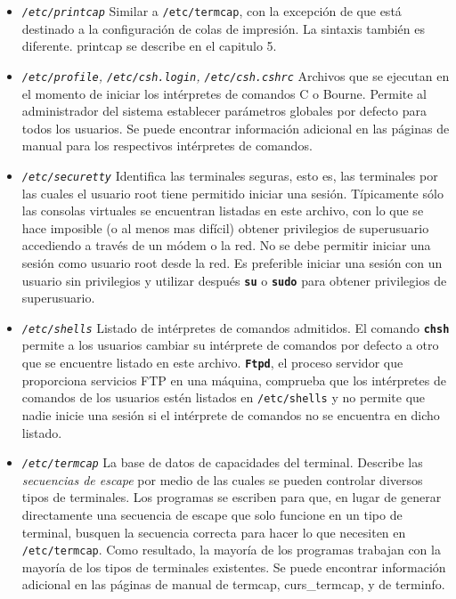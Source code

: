 \begin{itemize}
	
	\item \textit{\texttt{/etc/printcap}}
	 Similar a \texttt{/etc/termcap}, con la
	excepción de que está destinado a la configuración de colas de
	impresión. La sintaxis también es diferente.  printcap se describe en el
	capitulo 5.   
	

	
	\item \textit{\texttt{/etc/profile},
	\texttt{/etc/csh.login},
	\texttt{/etc/csh.cshrc}}  Archivos
	que se ejecutan en el momento de iniciar los intérpretes de comandos C o
	Bourne. Permite al administrador del sistema establecer parámetros
	globales por defecto para todos los usuarios. Se puede encontrar
	información adicional 	en las páginas de manual para los respectivos
	intérpretes de comandos.  



	\item \textit{\texttt{/etc/securetty}}
	 Identifica las terminales seguras, esto es, las
	terminales por las cuales el usuario root tiene permitido iniciar una
	sesión. Típicamente sólo las consolas virtuales se encuentran listadas
	en este archivo, con lo que se hace imposible (o al menos mas difícil)
	obtener privilegios de superusuario accediendo a través de un módem o la
	red. No se debe permitir iniciar una sesión como usuario root desde la
	red. Es preferible iniciar una sesión con un usuario sin privilegios y
	utilizar después \texttt{\textbf{su}} o \texttt{\textbf{sudo}} para
	obtener privilegios de superusuario.  



	\item \textit{\texttt{/etc/shells}}
	 Listado de intérpretes de comandos admitidos.  El
	comando \texttt{\textbf{chsh}} permite a los usuarios cambiar su
	intérprete de comandos por defecto a otro que se encuentre listado en
	este archivo. \texttt{\textbf{Ftpd}}, el proceso servidor que
	proporciona 	servicios FTP en una máquina, comprueba que los
	intérpretes de comandos 		de los usuarios estén listados
	en \texttt{/etc/shells} y no 		permite que
	nadie inicie una sesión si el intérprete de comandos no se encuentra en
	dicho listado.  

	
	\item \textit{\texttt{/etc/termcap}}
	 La base de datos de capacidades del terminal. Describe
	las \textit{secuencias de escape} por medio de 		las
	cuales se pueden controlar diversos tipos de terminales. Los programas
	se escriben para que, en lugar de generar directamente una secuencia de
	escape que solo funcione en un tipo de terminal, busquen la secuencia
	correcta para hacer lo que necesiten en
	\texttt{/etc/termcap}. 		Como resultado, la
	mayoría de los programas trabajan con la mayoría de los
	tipos de terminales existentes. Se puede encontrar información adicional
	en 	las páginas de manual de termcap, curs\_termcap, y de terminfo.
	

 \end{itemize} 
    



